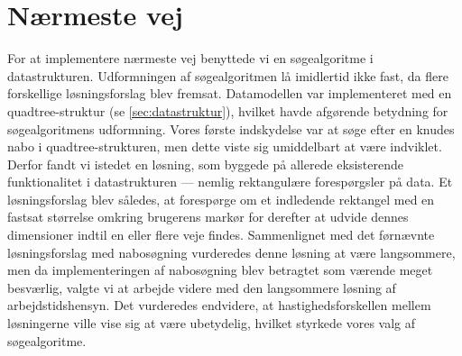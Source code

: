 \section{Nærmeste vej}
For at implementere nærmeste vej benyttede vi en søgealgoritme i datastrukturen. Udformningen af søgealgoritmen lå imidlertid ikke fast, da flere forskellige løsningsforslag blev fremsat. Datamodellen var implementeret med en quadtree-struktur (se \ref{sec:datastruktur}), hvilket havde afgørende betydning for søgealgoritmens udformning. Vores første indskydelse var at søge efter en knudes nabo i quadtree-strukturen, men dette viste sig umiddelbart at være indviklet. Derfor fandt vi istedet en løsning, som byggede på allerede eksisterende funktionalitet i datastrukturen --- nemlig rektangulære forespørgsler på data. Et løsningsforslag blev således, at forespørge om et indledende rektangel med en fastsat størrelse omkring brugerens markør for derefter at udvide dennes dimensioner indtil en eller flere veje findes. Sammenlignet med det førnævnte løsningsforslag med nabosøgning vurderedes denne løsning at være langsommere, men da implementeringen af nabosøgning blev betragtet som værende meget besværlig, valgte vi at arbejde videre med den langsommere løsning af arbejdstidshensyn. Det vurderedes endvidere, at hastighedsforskellen mellem løsningerne ville vise sig at være ubetydelig, hvilket styrkede vores valg af søgealgoritme.